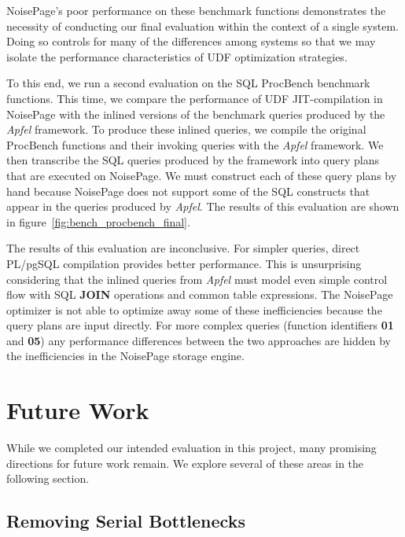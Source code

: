 \documentclass{vldb}
\newcommand{\dbCode}[1]{{\sffamily\small \textbf{#1}}\xspace}
\newcommand{\plpgsql}{PL/pgSQL\xspace}
\begin{document}
NoisePage's poor performance on these benchmark functions demonstrates the necessity of conducting our final evaluation within the context of a single system. Doing so controls for many of the differences among systems so that we may isolate the performance characteristics of UDF optimization strategies. 

To this end, we run a second evaluation on the SQL ProcBench benchmark functions. This time, we compare the performance of UDF JIT-compilation in NoisePage with the inlined versions of the benchmark queries produced by the \textit{Apfel} framework. To produce these inlined queries, we compile the original ProcBench functions and their invoking queries with the \textit{Apfel} framework. We then transcribe the SQL queries produced by the framework into query plans that are executed on NoisePage. We must construct each of these query plans by hand because NoisePage does not support some of the SQL constructs that appear in the queries produced by \textit{Apfel}. The results of this evaluation are shown in figure~\ref{fig:bench_procbench_final}.

The results of this evaluation are inconclusive. For simpler queries, direct \plpgsql compilation provides better performance. This is unsurprising considering that the inlined queries from \textit{Apfel} must model even simple control flow with SQL \dbCode{JOIN} operations and common table expressions. The NoisePage optimizer is not able to optimize away some of these inefficiencies because the query plans are input directly. For more complex queries (function identifiers \dbCode{01} and \dbCode{05}) any performance differences between the two approaches are hidden by the inefficiencies in the NoisePage storage engine. 


\section{Future Work}

While we completed our intended evaluation in this project, many promising directions for future work remain. We explore several of these areas in the following section.

\subsection{Removing Serial Bottlenecks}
\end{document}

